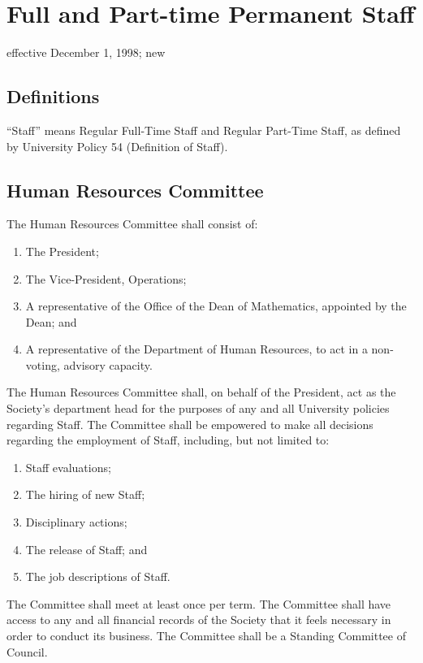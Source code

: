 \section{Full and Part-time Permanent Staff}
effective December 1, 1998; new
\subsection{Definitions}
“Staff” means Regular Full-Time Staff and Regular Part-Time Staff, as defined by University Policy 54 (Definition of Staff).
\subsection{Human Resources Committee}
The Human Resources Committee shall consist of:
\begin{enumerate}
\item The President;
\item The Vice-President, Operations;
\item A representative of the Office of the Dean of Mathematics, appointed by the Dean; and
\item A representative of the Department of Human Resources, to act in a non-voting, advisory capacity.
\end{enumerate}

The Human Resources Committee shall, on behalf of the President, act as the Society’s department head for the purposes of any and all University policies regarding Staff.
The Committee shall be empowered to make all decisions regarding the employment of Staff, including, but not limited to:
\begin{enumerate}
\item Staff evaluations;
\item The hiring of new Staff;
\item Disciplinary actions;
\item The release of Staff; and
\item The job descriptions of Staff.
\end{enumerate}

The Committee shall meet at least once per term.
The Committee shall have access to any and all financial records of the Society that it feels necessary in order to conduct its business.
The Committee shall be a Standing Committee of Council.
